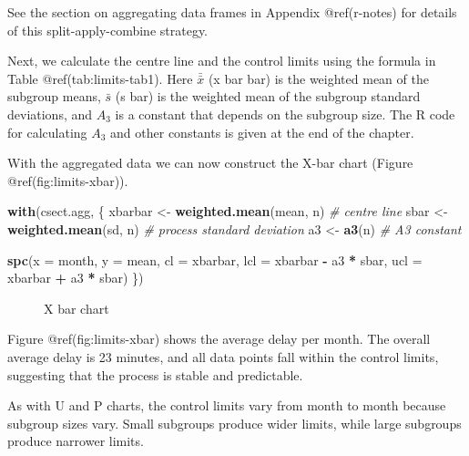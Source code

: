 \documentclass[
]{book}
\makeatletter
\newenvironment{Shaded}{\begin{snugshade}}{\end{snugshade}}
\newcommand{\AttributeTok}[1]{\textcolor[rgb]{0.13,0.29,0.53}{#1}}
\newcommand{\CommentTok}[1]{\textcolor[rgb]{0.56,0.35,0.01}{\textit{#1}}}
\newcommand{\FunctionTok}[1]{\textcolor[rgb]{0.13,0.29,0.53}{\textbf{#1}}}
\newcommand{\NormalTok}[1]{#1}
\newcommand{\OtherTok}[1]{\textcolor[rgb]{0.56,0.35,0.01}{#1}}
\newcommand{\SpecialCharTok}[1]{\textcolor[rgb]{0.81,0.36,0.00}{\textbf{#1}}}
\newcommand*\pandocbounded[1]{%
  \sbox\pandoc@box{#1}%
  \Gscale@div\@tempa{\textheight}{\dimexpr\ht\pandoc@box+\dp\pandoc@box\relax}%
  \Gscale@div\@tempb{\linewidth}{\wd\pandoc@box}%
  \ifdim\@tempb\p@<\@tempa\p@\let\@tempa\@tempb\fi%
  \ifdim\@tempa\p@<\p@\scalebox{\@tempa}{\usebox\pandoc@box}%
  \else\usebox{\pandoc@box}%
  \fi%
}
\makeatother
\begin{document}
See the section on aggregating data frames in Appendix @ref(r-notes) for
details of this split-apply-combine strategy.

Next, we calculate the centre line and the control limits using the
formula in Table @ref(tab:limits-tab1). Here \(\bar{\bar{x}}\) (x bar
bar) is the weighted mean of the subgroup means, \(\bar{s}\) (s bar) is
the weighted mean of the subgroup standard deviations, and \(A_3\) is a
constant that depends on the subgroup size. The R code for calculating
\(A_3\) and other constants is given at the end of the chapter.

With the aggregated data we can now construct the X-bar chart (Figure
@ref(fig:limits-xbar)).

\begin{Shaded}
\begin{Highlighting}[]
\FunctionTok{with}\NormalTok{(csect.agg, \{}
\NormalTok{  xbarbar }\OtherTok{\textless{}{-}} \FunctionTok{weighted.mean}\NormalTok{(mean, n)  }\CommentTok{\# centre line}
\NormalTok{  sbar    }\OtherTok{\textless{}{-}} \FunctionTok{weighted.mean}\NormalTok{(sd, n)    }\CommentTok{\# process standard deviation}
\NormalTok{  a3      }\OtherTok{\textless{}{-}} \FunctionTok{a3}\NormalTok{(n)                   }\CommentTok{\# A3 constant}
  
  \FunctionTok{spc}\NormalTok{(}\AttributeTok{x   =}\NormalTok{ month,}
      \AttributeTok{y   =}\NormalTok{ mean,}
      \AttributeTok{cl  =}\NormalTok{ xbarbar,}
      \AttributeTok{lcl =}\NormalTok{ xbarbar }\SpecialCharTok{{-}}\NormalTok{ a3 }\SpecialCharTok{*}\NormalTok{ sbar,}
      \AttributeTok{ucl =}\NormalTok{ xbarbar }\SpecialCharTok{+}\NormalTok{ a3 }\SpecialCharTok{*}\NormalTok{ sbar)}
\NormalTok{\})}
\end{Highlighting}
\end{Shaded}

\begin{figure}
\centering
\pandocbounded{}
\caption{X bar chart}
\end{figure}

Figure @ref(fig:limits-xbar) shows the average delay per month. The
overall average delay is 23 minutes, and all data points fall within the
control limits, suggesting that the process is stable and predictable.

As with U and P charts, the control limits vary from month to month
because subgroup sizes vary. Small subgroups produce wider limits, while
large subgroups produce narrower limits.
\end{document}
